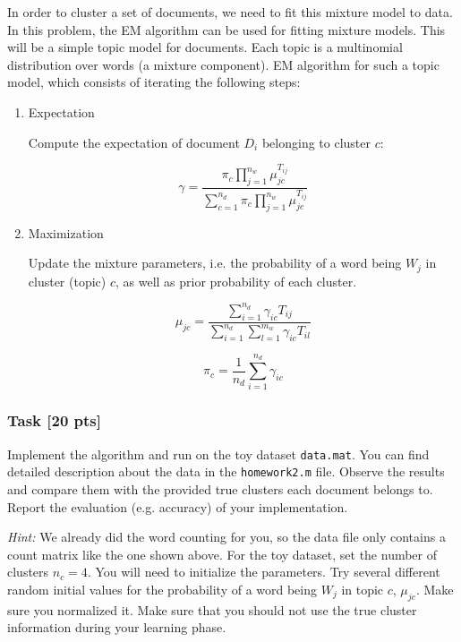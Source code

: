 \documentclass[twoside,10pt]{article}
\begin{document}
In order to cluster a set of documents, we need to fit this mixture
model to data. In this problem, the EM algorithm can be used for
fitting mixture models. This will be a simple topic model for
documents. Each topic is a multinomial distribution over words (a
mixture component). EM algorithm for such a topic model, which
consists of iterating the following steps:

\begin{enumerate}
\item Expectation

Compute the expectation of document $D_i$ belonging to cluster $c$:

\begin{equation}
\gamma =  \frac{\pi_c \prod_{j=1}^{n_w}
\mu_{jc}^{T_{ij}}}{\sum_{c=1}^{n_d} \pi_c \prod_{j=1}^{n_w}
\mu_{jc}^{T_{ij}}}\nonumber
\end{equation}

\item Maximization

Update the mixture parameters, i.e. the probability of a word being
$W_j$ in cluster (topic) $c$, as well as prior probability of each
cluster.


\begin{equation}
\mu_{jc} =
\frac{\sum_{i=1}^{n_d}\gamma_{ic}T_{ij}}{\sum_{i=1}^{n_d}\sum_{l=1}^{m_w}
\gamma_{ic}T_{il}}\nonumber
\end{equation}

\begin{equation}
 \pi_c = \frac{1}{n_d}
\sum_{i=1}^{n_d}\gamma_{ic}\nonumber
\end{equation}

\end{enumerate}


\subsubsection*{Task [20
pts]}

Implement the algorithm and run on the toy dataset \texttt{data.mat}. You
can find detailed description about the data in the
\texttt{homework2.m} file. Observe the results and compare them with
the provided true clusters each document belongs to. Report the
evaluation (e.g. accuracy) of your implementation.

\emph{Hint:} We already did the word counting for you, so the data
file only contains a count matrix like the one shown above. For the toy dataset, set the
number of clusters $n_c = 4$. You will need to initialize the
parameters. Try several different random initial values for the
probability of a word being $W_j$ in topic $c$, $\mu_{jc}$. Make
sure you normalized it. Make sure that you should not use the true
cluster information during your learning phase.
\end{document}
